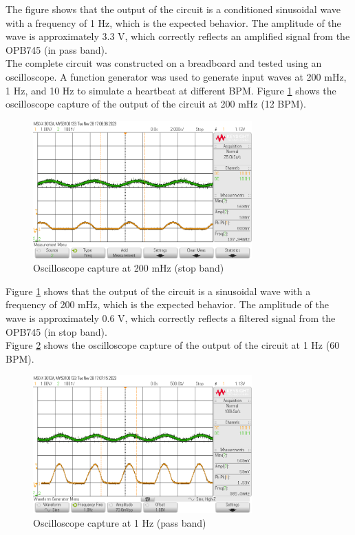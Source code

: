 \documentclass[CMPE]{KGCOEReport}
\begin{document}
The figure shows that the output of the circuit is a conditioned sinusoidal wave with a frequency of 1 Hz, which is the expected behavior. The amplitude of the wave is approximately 3.3 V, which correctly reflects an amplified signal from the OPB745 (in pass band).\\

The complete circuit was constructed on a breadboard and tested using an oscilloscope. A function generator was used to generate input waves at 200 mHz, 1 Hz, and 10 Hz to simulate a heartbeat at different BPM. Figure \ref{fig:200mHzCapture} shows the oscilloscope capture of the output of the circuit at 200 mHz (12 BPM).

\begin{figure}[H]
    \centering
    \includegraphics[width=0.75\textwidth]{200mHz.png}
    \caption{Oscilloscope capture at 200 mHz (stop band)}
    \label{fig:200mHzCapture}
\end{figure}

Figure \ref{fig:200mHzCapture} shows that the output of the circuit is a sinusoidal wave with a frequency of 200 mHz, which is the expected behavior. The amplitude of the wave is approximately 0.6 V, which correctly reflects a filtered signal from the OPB745 (in stop band).\\

Figure \ref{fig:1HzCapture} shows the oscilloscope capture of the output of the circuit at 1 Hz (60 BPM).

\begin{figure}[H]
    \centering
    \includegraphics[width=0.75\textwidth]{1Hz.png}
    \caption{Oscilloscope capture at 1 Hz (pass band)}
    \label{fig:1HzCapture}
\end{figure}
\end{document}
